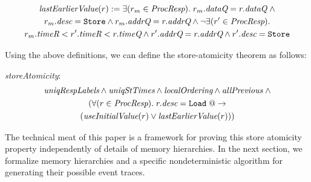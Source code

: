 \vspace{-.3in}

\begin{defn}
\small
\begin{multline*}
\textit{lastEarlierValue}(r) := \exists (r_m \in \textit{ProcResp}). \; r_m.\textit{dataQ} = r.\textit{dataQ} \; \wedge 
\\ r_m.\textit{desc} = \texttt{Store} \wedge r_m.\textit{addrQ} = r.\textit{addrQ} \wedge
\neg \exists (r' \in \textit{ProcResp}). \\
r_m.\textit{timeR} < r'.\textit{timeR} < r.\textit{timeQ} \wedge r'.\textit{addrQ} = r.\textit{addrQ} \wedge r'.\textit{desc} = \texttt{Store}
\end{multline*}
\label{lastEarlierValue}
\end{defn}

\vspace{-.3in}

Using the above definitions, we can define the store-atomicity theorem as follows:
\begin{thm}\textit{storeAtomicity}:
\small
\begin{multline*}
\textit{uniqRespLabels} \wedge
\textit{uniqStTimes} \wedge \textit{localOrdering} \wedge \textit{allPrevious} \; \wedge \\
(\forall (r \in \textit{ProcResp}). \; r.\textit{desc} = \texttt{Load} \; @-> \\
(\textit{useInitialValue}(r) \vee \textit{lastEarlierValue}(r)))
\end{multline*}
\label{storeAtomicity}
\end{thm}

\vspace{-.3in}

The technical meat of this paper is a framework for proving this store atomicity
property independently of details of memory hierarchies.  In the next section,
we formalize memory hierarchies and a specific nondeterministic algorithm for
generating their possible event traces.
